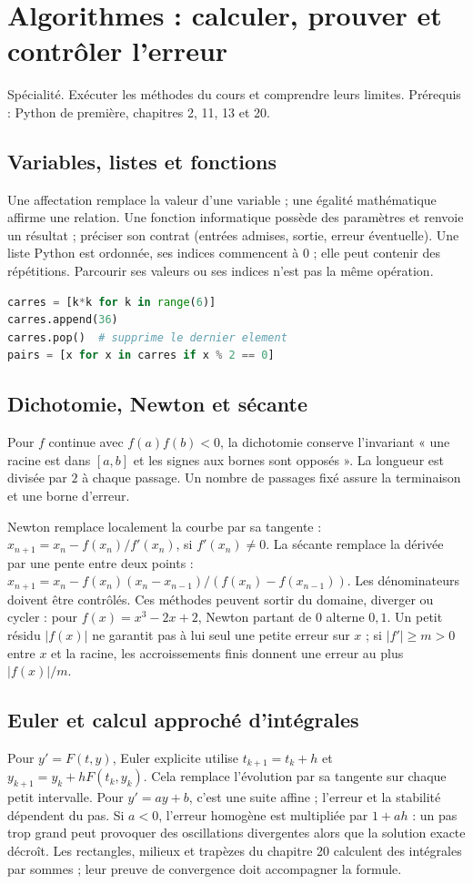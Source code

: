 \documentclass[../cours_tle.tex]{subfiles}
\begin{document}
\setcounter{chapter}{23}
\chapter{Algorithmes : calculer, prouver et contrôler l’erreur}
\label{ch:24}
\begin{objectif}
Spécialité. Exécuter les méthodes du cours et comprendre leurs limites. Prérequis : Python de première, chapitres 2, 11, 13 et 20.
\end{objectif}
\section{Variables, listes et fonctions}
Une affectation remplace la valeur d'une variable ; une égalité mathématique affirme une relation. Une fonction informatique possède des paramètres et renvoie un résultat ; préciser son contrat (entrées admises, sortie, erreur éventuelle).
Une liste Python est ordonnée, ses indices commencent à $0$ ; elle peut contenir des répétitions. Parcourir ses valeurs ou ses indices n'est pas la même opération.
\begin{lstlisting}[language=Python]
carres = [k*k for k in range(6)]
carres.append(36)
carres.pop()  # supprime le dernier element
pairs = [x for x in carres if x % 2 == 0]
\end{lstlisting}
\section{Dichotomie, Newton et sécante}
Pour $f$ continue avec $f(a)f(b)<0$, la dichotomie conserve l'invariant « une racine est dans $[a,b]$ et les signes aux bornes sont opposés ». La longueur est divisée par $2$ à chaque passage. Un nombre de passages fixé assure la terminaison et une borne d'erreur.

Newton remplace localement la courbe par sa tangente :
$x_{n+1}=x_n-f(x_n)/f'(x_n)$, si $f'(x_n)\ne0$.
La sécante remplace la dérivée par une pente entre deux points :
$x_{n+1}=x_n-f(x_n)(x_n-x_{n-1})/(f(x_n)-f(x_{n-1}))$.
Les dénominateurs doivent être contrôlés. Ces méthodes peuvent sortir du domaine, diverger ou cycler : pour $f(x)=x^3-2x+2$, Newton partant de $0$ alterne $0,1$.
Un petit résidu $|f(x)|$ ne garantit pas à lui seul une petite erreur sur $x$ ; si $|f'|\ge m>0$ entre $x$ et la racine, les accroissements finis donnent une erreur au plus $|f(x)|/m$.
\section{Euler et calcul approché d'intégrales}
Pour $y'=F(t,y)$, Euler explicite utilise $t_{k+1}=t_k+h$ et $y_{k+1}=y_k+hF(t_k,y_k)$.
Cela remplace l'évolution par sa tangente sur chaque petit intervalle. Pour $y'=ay+b$, c'est une suite affine ; l'erreur et la stabilité dépendent du pas.
Si $a<0$, l'erreur homogène est multipliée par $1+ah$ : un pas trop grand peut provoquer des oscillations divergentes alors que la solution exacte décroît.
Les rectangles, milieux et trapèzes du chapitre 20 calculent des intégrales par sommes ; leur preuve de convergence doit accompagner la formule.
\end{document}
